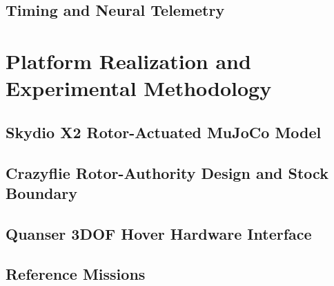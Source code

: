 \documentclass[letterpaper,10pt,conference]{ieeeconf}
\begin{document}
\subsection{Timing and Neural Telemetry}


\section{Platform Realization and Experimental Methodology}
\label{sec:platform_method}

\subsection{Skydio X2 Rotor-Actuated MuJoCo Model}


\subsection{Crazyflie Rotor-Authority Design and Stock Boundary}


\subsection{Quanser 3DOF Hover Hardware Interface}


\subsection{Reference Missions}

\end{document}
